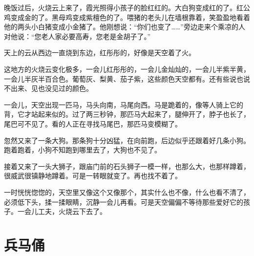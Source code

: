 \documentclass[12pt,UTF-8,openany]{ctexbook}
\begin{document}
\begin{large}
    
    晚饭过后，火烧云上来了，霞光照得小孩子的脸红红的。大白狗变成红的了。红公鸡变成金的了。黑母鸡变成紫檀色的了。喂猪的老头儿在墙根靠着，笑盈盈地看着他的两头小白猪变成小金猪了。他刚想说：“你们也变了……”旁边走来个乘凉的人对他说：“您老人家必要高寿，您老是金胡子了。”
    
    天上的云从西边一直烧到东边，红彤彤的，好像是天空着了火。
    
    这地方的火烧云变化极多，一会儿红彤彤的，一会儿金灿灿的，一会儿半紫半黄，一会儿半灰半百合色。葡萄灰、梨黄、茄子紫，这些颜色天空都有。还有些说也说不出来、见也没见过的颜色。
    
    一会儿，天空出现一匹马，马头向南，马尾向西。马是跪着的，像等人骑上它的背，它才站起来似的。过了两三秒钟，那匹马大起来了，腿伸开了，脖子也长了，尾巴可不见了。看的人正在寻找马尾巴，那匹马变模糊了。
    
    忽然又来了一条大狗。那条狗十分凶猛，在向前跑，后边似乎还跟着好几条小狗。跑着跑着，小狗不知跑到哪里去了，大狗也不见了。
    
    接着又来了一头大狮子，跟庙门前的石头狮子一模一样，也那么大，也那样蹲着，很威武很镇静地蹲着。可是一转眼就变了。再也找不着了。
    
    一时恍恍惚惚的，天空里又像这个又像那个，其实什么也不像，什么也看不清了，必须低下头，揉一揉眼睛，沉静一会儿再看。可是天空偏偏不等待那些爱好它的孩子。一会儿工夫，火烧云下去了。
    
\end{large}



\chapter{兵马俑}
\end{document}
